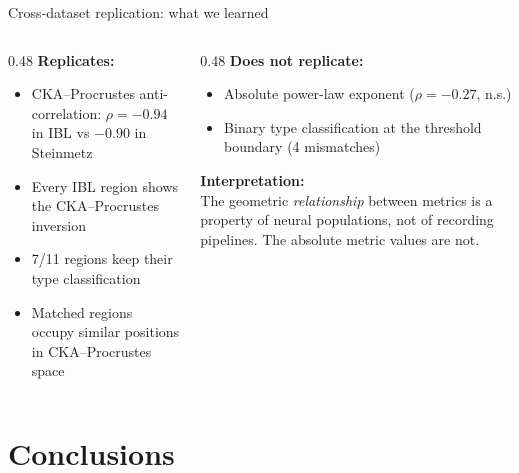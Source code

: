 \documentclass[aspectratio=169,11pt]{beamer}
\begin{document}
\begin{frame}{Cross-dataset replication: what we learned}
\vspace{-0.2em}
\begin{columns}[T]
\begin{column}{0.48\textwidth}
\textbf{\textcolor{pass}{Replicates:}}
\begin{itemize}\setlength\itemsep{0.15em}
  \item CKA--Procrustes anti-correlation: $\rho = -0.94$ in IBL vs $-0.90$ in Steinmetz
  \item Every IBL region shows the CKA--Procrustes inversion
  \item 7/11 regions keep their type classification
  \item Matched regions occupy similar positions in CKA--Procrustes space
\end{itemize}
\end{column}
\begin{column}{0.48\textwidth}
\textbf{\textcolor{fail}{Does not replicate:}}
\begin{itemize}\setlength\itemsep{0.15em}
  \item Absolute power-law exponent ($\rho = -0.27$, n.s.)
  \item Binary type classification at the threshold boundary (4 mismatches)
\end{itemize}

\vspace{0.5em}
\textbf{Interpretation:}\\[0.2em]
{\small The geometric \textit{relationship} between metrics is a property of neural populations, not of recording pipelines. The absolute metric values are not.}
\end{column}
\end{columns}
\end{frame}

\section{Conclusions}
\end{document}
